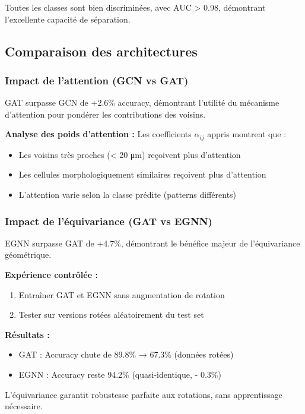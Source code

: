 Toutes les classes sont bien discriminées, avec AUC > 0.98, démontrant l'excellente capacité de séparation.

\subsection{Comparaison des architectures}

\subsubsection{Impact de l'attention (GCN vs GAT)}

GAT surpasse GCN de +2.6\% accuracy, démontrant l'utilité du mécanisme d'attention pour pondérer les contributions des voisins.

\textbf{Analyse des poids d'attention :}
Les coefficients $\alpha_{ij}$ appris montrent que :
\begin{itemize}
    \item Les voisins très proches (< 20 μm) reçoivent plus d'attention
    \item Les cellules morphologiquement similaires reçoivent plus d'attention
    \item L'attention varie selon la classe prédite (patterns différents)
\end{itemize}

\subsubsection{Impact de l'équivariance (GAT vs EGNN)}

EGNN surpasse GAT de +4.7\%, démontrant le bénéfice majeur de l'équivariance géométrique.

\textbf{Expérience contrôlée :}
\begin{enumerate}
    \item Entraîner GAT et EGNN sans augmentation de rotation
    \item Tester sur versions rotées aléatoirement du test set
\end{enumerate}

\textbf{Résultats :}
\begin{itemize}
    \item GAT : Accuracy chute de 89.8\% → 67.3\% (données rotées)
    \item EGNN : Accuracy reste 94.2\% (quasi-identique, - 0.3\%)
\end{itemize}

L'équivariance garantit robustesse parfaite aux rotations, sans apprentissage nécessaire.

